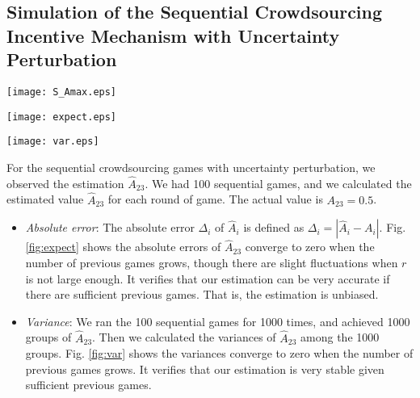 \documentclass{IEEEtran}
\begin{document}
\subsection{Simulation of the Sequential Crowdsourcing Incentive Mechanism with Uncertainty Perturbation}

\begin{figure*}[!t]
\begin{minipage}[b]{0.3\linewidth}
	\centering
	\texttt{[image: S\_Amax.eps]}
	\caption{Impact of $A_{max}$ on $|\mathcal{S}|$}
	\label{fig:S_Amax}
\end{minipage}
\hspace{0.2cm}
\begin{minipage}[b]{0.3\linewidth}
	\centering
	\texttt{[image: expect.eps]}
	\caption{Absolute errors of $\hat{A}_{23}$}
	\label{fig:expect}
\end{minipage}
\hspace{0.2cm}
\begin{minipage}[b]{0.3\linewidth}
	\centering
	\texttt{[image: var.eps]}
	\caption{Variances of $\hat{A}_{23}$}
	\label{fig:var}
\end{minipage}
\end{figure*}

For the sequential crowdsourcing games with uncertainty perturbation, we observed the estimation $\hat{A}_{23}$. We had 100 sequential games, and we calculated the estimated value $\hat{A}_{23}$ for each round of game. The actual value is $A_{23}=0.5$.
\begin{itemize}
\item \emph{Absolute error}: The absolute error $\Delta_i$ of $\hat{A}_i$ is defined as $\Delta_i = |\hat{A}_i - A_i|$. Fig. \ref{fig:expect} shows the absolute errors of $\hat{A}_{23}$ converge to zero when the number of previous games grows, though there are slight fluctuations when $r$ is not large enough. It verifies that our estimation can be very accurate if there are sufficient previous games. That is, the estimation is unbiased.

\item \emph{Variance}: We ran the 100 sequential games for 1000 times, and achieved 1000 groups of $\hat{A}_{23}$. Then we calculated the variances of $\hat{A}_{23}$ among the 1000 groups. Fig. \ref{fig:var} shows the variances converge to zero when the number of previous games grows. It verifies that our estimation is very stable given sufficient previous games.

\end{itemize}
\end{document}
